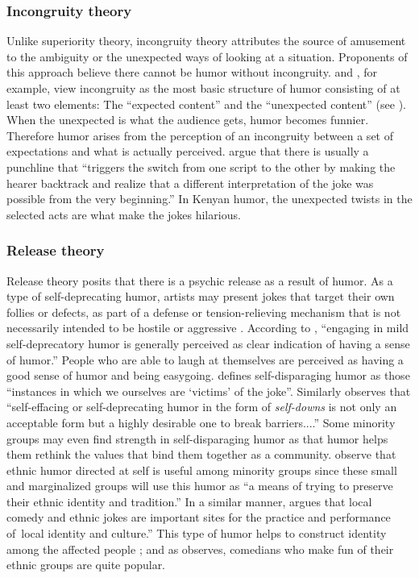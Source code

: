 \documentclass[output=paper]{langsci/langscibook}
\begin{document}
\subsubsection{Incongruity theory}

Unlike superiority theory, incongruity theory attributes the source of amusement to the ambiguity or the unexpected ways of looking at a situation. Proponents of this approach believe there cannot be humor without incongruity. \citet{Berk1999} and \citet{Caroll2014}, for example, view incongruity as the most basic structure of humor consisting of at least two elements: The “expected content” and the “unexpected content” (see \citealt[7]{Berk1999}). When the unexpected is what the audience gets, humor becomes funnier. Therefore humor arises from the perception of an incongruity between a set of expectations and what is actually perceived.  \citet[308]{AttardoRaskin1999} argue that there is usually a punchline that “triggers the switch from one script to the other by making the hearer backtrack and realize that a different interpretation of the joke was possible from the very beginning.” In Kenyan humor, the unexpected twists in the selected acts are what make the jokes hilarious. 

\subsubsection{Release theory}

Release theory posits that there is a psychic release as a result of humor. As a type of self-deprecating humor, artists may present jokes that target their own follies or defects, as part of a defense or tension-relieving mechanism that is not necessarily intended to be hostile or aggressive \citep{Davies1990,Gulas2006}. According to \citet[30]{Apte1987}, “engaging in mild self-deprecatory humor is generally perceived as clear indication of having a sense of humor.” People who are able to laugh at themselves are perceived as having a good sense of humor and being easygoing. \citet[x]{Ziv1988} defines self-disparaging humor as those “instances in which we ourselves are ‘victims’ of the joke”. Similarly \citet[12]{Berk1999} observes that “self-effacing or self-deprecating humor in the form of \textit{self-downs} is not only an acceptable form but a highly desirable one to break barriers....” Some minority groups may even find strength in self-disparaging humor as that humor helps them rethink the values that bind them together as a community. \citet[172]{GonzalesWiseman2005} observe that ethnic humor directed at self is useful among minority groups since these small and marginalized groups will use this humor as “a means of trying to preserve their ethnic identity and tradition.” In a similar manner, \citet[298]{Labrador2004} argues that {local comedy and ethnic jokes are important sites for the practice and performance of~local identity and culture.” }This type of humor helps to construct identity among the affected people \citep{Labrador2004,Rappoport2005}; and as \citet[36]{Apte1987} observes, comedians who make fun of their ethnic groups are quite popular. 
\end{document}
